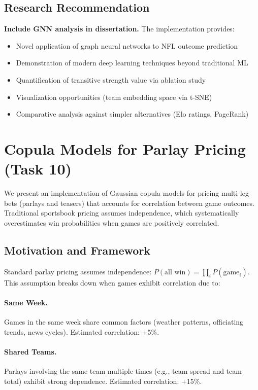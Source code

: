 \documentclass[12pt]{report}  %
\numberwithin{equation}{section}
\theoremstyle{plain}
\theoremstyle{definition}
\theoremstyle{remark}
\begin{document}
\subsection{Research Recommendation}
\textbf{Include GNN analysis in dissertation.} The implementation provides:
\begin{itemize}
  \item Novel application of graph neural networks to NFL outcome prediction
  \item Demonstration of modern deep learning techniques beyond traditional ML
  \item Quantification of transitive strength value via ablation study
  \item Visualization opportunities (team embedding space via t-SNE)
  \item Comparative analysis against simpler alternatives (Elo ratings, PageRank)
\end{itemize}

\section{Copula Models for Parlay Pricing (Task 10)}
We present an implementation of Gaussian copula models for pricing multi-leg bets (parlays and teasers) that accounts for correlation between game outcomes. Traditional sportsbook pricing assumes independence, which systematically overestimates win probabilities when games are positively correlated.

\subsection{Motivation and Framework}
Standard parlay pricing assumes independence: $P(\text{all win}) = \prod_i P(\text{game}_i)$. This assumption breaks down when games exhibit correlation due to:

\paragraph{Same Week.}
Games in the same week share common factors (weather patterns, officiating trends, news cycles). Estimated correlation: +5\%.

\paragraph{Shared Teams.}
Parlays involving the same team multiple times (e.g., team spread and team total) exhibit strong dependence. Estimated correlation: +15\%.
\end{document}
